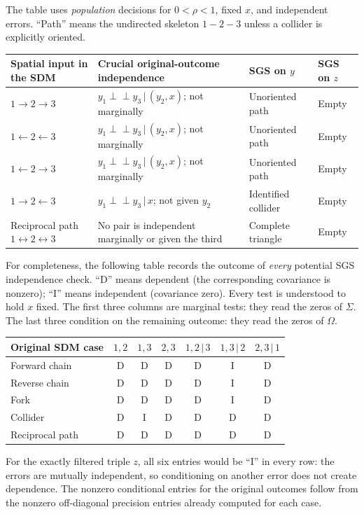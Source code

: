 \documentclass[11pt,a4paper]{article}
\newcommand{\indep}{\mathrel{\perp\!\!\!\perp}}
\newcommand{\given}{\,\vert\,}
\begin{document}
The table uses \emph{population} decisions for $0<\rho<1$, fixed $x$, and independent errors. ``Path'' means the undirected skeleton $1-2-3$ unless a collider is explicitly oriented.
\begin{center}
\small
\begin{tabularx}{\linewidth}{@{}p{26mm}X p{30mm}p{28mm}@{}}
\toprule
Spatial input in the SDM&Crucial original-outcome independence&SGS on $y$&SGS on $z$\\\midrule
$1\to2\to3$&$y_1\indep y_3\given(y_2,x)$; not marginally&Unoriented path&Empty\\
$1\leftarrow2\leftarrow3$&$y_1\indep y_3\given(y_2,x)$; not marginally&Unoriented path&Empty\\
$1\leftarrow2\to3$&$y_1\indep y_3\given(y_2,x)$; not marginally&Unoriented path&Empty\\
$1\to2\leftarrow3$&$y_1\indep y_3\given x$; not given $y_2$&Identified collider&Empty\\
Reciprocal path $1\leftrightarrow2\leftrightarrow3$&No pair is independent marginally or given the third&Complete triangle&Empty\\\bottomrule
\end{tabularx}
\end{center}
For completeness, the following table records the outcome of \emph{every} potential SGS independence check. ``D'' means dependent (the corresponding covariance is nonzero); ``I'' means independent (covariance zero). Every test is understood to hold $x$ fixed. The first three columns are marginal tests: they read the zeros of $\Sigma$. The last three condition on the remaining outcome: they read the zeros of $\Omega$.
\begin{center}
\small
\begin{tabular}{@{}lcccccc@{}}
\toprule
Original SDM case &$1,2$&$1,3$&$2,3$&$1,2\given3$&$1,3\given2$&$2,3\given1$\\\midrule
Forward chain&D&D&D&D&I&D\\
Reverse chain&D&D&D&D&I&D\\
Fork&D&D&D&D&I&D\\
Collider&D&I&D&D&D&D\\
Reciprocal path&D&D&D&D&D&D\\\bottomrule
\end{tabular}
\end{center}
For the exactly filtered triple $z$, all six entries would be ``I'' in every row: the errors are mutually independent, so conditioning on another error does not create dependence. The nonzero conditional entries for the original outcomes follow from the nonzero off-diagonal precision entries already computed for each case.
\end{document}
